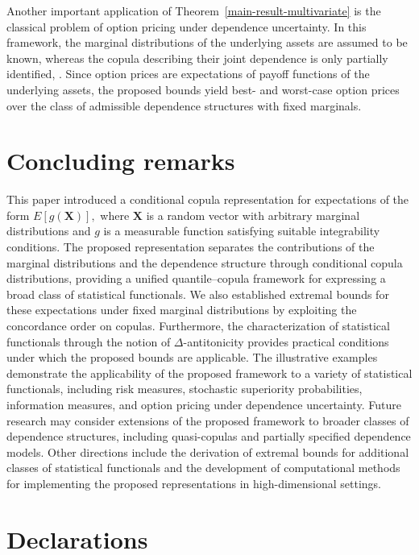 \documentclass[12pt]{article}
\begin{document}
Another important application of Theorem~\ref{main-result-multivariate} is the classical problem of option pricing under dependence uncertainty. In this framework, the marginal distributions of the underlying assets are assumed to be known, whereas the copula describing their joint dependence is only partially identified, \cite{Lux2017}. Since option prices are expectations of payoff functions of the underlying assets, the proposed bounds yield best- and worst-case option prices over the class of admissible dependence structures with fixed marginals.


\section{Concluding remarks} \label{sect:5}

This paper introduced a conditional copula representation for expectations of the form
$
E[g(\boldsymbol{X})],
$
where $\boldsymbol{X}$ is a random vector with arbitrary marginal distributions and $g$ is a measurable function satisfying suitable integrability conditions. The proposed representation separates the contributions of the marginal distributions and the dependence structure through conditional copula distributions, providing a unified quantile--copula framework for expressing a broad class of statistical functionals.
We also established extremal bounds for these expectations under fixed marginal distributions by exploiting the concordance order on copulas. Furthermore, the characterization of statistical functionals through the notion of $\Delta$-antitonicity provides practical conditions under which the proposed bounds are applicable.
The illustrative examples demonstrate the applicability of the proposed framework to a variety of statistical functionals, including risk measures, stochastic superiority probabilities, information measures, and option pricing under dependence uncertainty.
Future research may consider extensions of the proposed framework to broader classes of dependence structures, including quasi-copulas and partially specified dependence models. Other directions include the derivation of extremal bounds for additional classes of statistical functionals and the development of computational methods for implementing the proposed representations in high-dimensional settings.





\section*{Declarations}
\end{document}
